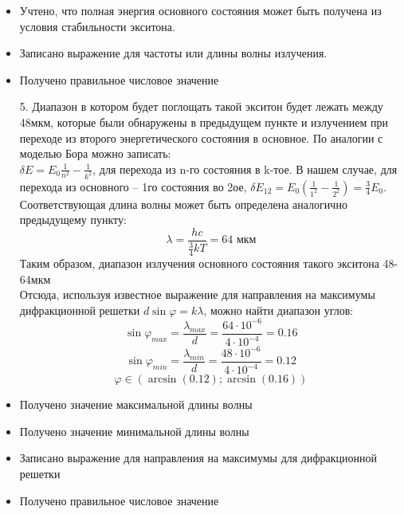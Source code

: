 \begin{itemize}
\item Учтено, что полная энергия основного состояния может быть получена из условия стабильности экситона.
\item Записано выражение для частоты или длины волны излучения.
\item Получено правильное числовое значение
\end{itemize}
\begin{enumerate}
\item[5.] Диапазон в котором будет поглощать такой экситон будет лежать между 48мкм, которые были обнаружены в предыдущем пункте и излучением при переходе из второго энергетического состояния в основное. По аналогии с моделью Бора можно записать:\\
$\delta E=E_0\frac{1}{n^2}-\frac{1}{k^2}$, для перехода из n-го состояния в k-тое. В нашем случае, для перехода из основного – 1го состояния во 2ое, $\delta E_12=E_0\left(\frac{1}{1^2}-\frac{1}{2^2}\right)=\frac{3}{4}E_0$.\\
Соответствующая длина волны может быть определена аналогично предыдущему пункту:\\
$$\lambda=\frac{hc}{\frac{3}{4}kT}=64\text{ мкм}$$
Таким образом, диапазон излучения основного состояния такого экситона 48-64мкм\\
Отсюда, используя известное выражение для направления на максимумы дифракционной решетки $d\sin\varphi=k\lambda$, можно найти диапазон углов:
$$\sin\varphi_{max}=\frac{\lambda_{max}}{d}=\frac{64\cdot10^{-6}}{4\cdot10^{-4}}=0.16$$					
$$\sin\varphi_{min}=\frac{\lambda_{min}}{d}=\frac{48\cdot10^{-6}}{4\cdot10^{-4}}=0.12$$
$$\varphi\in(\arcsin(0.12);\arcsin(0.16))$$
\end{enumerate}

\markSection

\begin{itemize}
\item Получено значение максимальной длины волны
\item Получено значение минимальной длины волны
\item Записано выражение для направления на максимумы для дифракционной решетки
\item Получено правильное числовое значение
\end{itemize}
